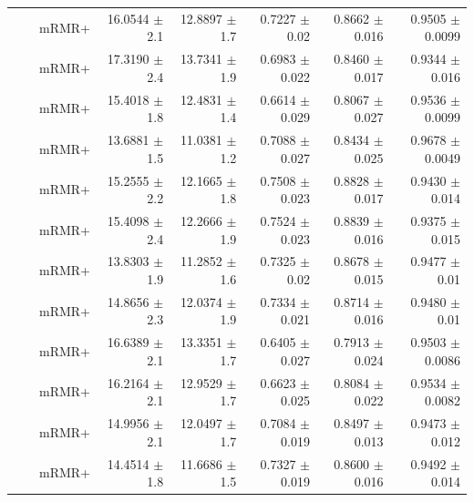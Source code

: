 \begin{longtable}{llp{}rrrrr}
 &  & mRMR+ & 16.0544 {\scriptsize $\pm$ 2.1} & 12.8897 {\scriptsize $\pm$ 1.7} & 0.7227 {\scriptsize $\pm$ 0.02} & 0.8662 {\scriptsize $\pm$ 0.016} & 0.9505 {\scriptsize $\pm$ 0.0099} \\
 &  & mRMR+ & 17.3190 {\scriptsize $\pm$ 2.4} & 13.7341 {\scriptsize $\pm$ 1.9} & 0.6983 {\scriptsize $\pm$ 0.022} & 0.8460 {\scriptsize $\pm$ 0.017} & 0.9344 {\scriptsize $\pm$ 0.016} \\
 &  & mRMR+ & 15.4018 {\scriptsize $\pm$ 1.8} & 12.4831 {\scriptsize $\pm$ 1.4} & 0.6614 {\scriptsize $\pm$ 0.029} & 0.8067 {\scriptsize $\pm$ 0.027} & 0.9536 {\scriptsize $\pm$ 0.0099} \\
 &  & mRMR+ & 13.6881 {\scriptsize $\pm$ 1.5} & 11.0381 {\scriptsize $\pm$ 1.2} & 0.7088 {\scriptsize $\pm$ 0.027} & 0.8434 {\scriptsize $\pm$ 0.025} & 0.9678 {\scriptsize $\pm$ 0.0049} \\
 &  & mRMR+ & 15.2555 {\scriptsize $\pm$ 2.2} & 12.1665 {\scriptsize $\pm$ 1.8} & 0.7508 {\scriptsize $\pm$ 0.023} & 0.8828 {\scriptsize $\pm$ 0.017} & 0.9430 {\scriptsize $\pm$ 0.014} \\
 &  & mRMR+ & 15.4098 {\scriptsize $\pm$ 2.4} & 12.2666 {\scriptsize $\pm$ 1.9} & 0.7524 {\scriptsize $\pm$ 0.023} & 0.8839 {\scriptsize $\pm$ 0.016} & 0.9375 {\scriptsize $\pm$ 0.015} \\
 &  & mRMR+ & 13.8303 {\scriptsize $\pm$ 1.9} & 11.2852 {\scriptsize $\pm$ 1.6} & 0.7325 {\scriptsize $\pm$ 0.02} & 0.8678 {\scriptsize $\pm$ 0.015} & 0.9477 {\scriptsize $\pm$ 0.01} \\
 &  & mRMR+ & 14.8656 {\scriptsize $\pm$ 2.3} & 12.0374 {\scriptsize $\pm$ 1.9} & 0.7334 {\scriptsize $\pm$ 0.021} & 0.8714 {\scriptsize $\pm$ 0.016} & 0.9480 {\scriptsize $\pm$ 0.01} \\
 &  & mRMR+ & 16.6389 {\scriptsize $\pm$ 2.1} & 13.3351 {\scriptsize $\pm$ 1.7} & 0.6405 {\scriptsize $\pm$ 0.027} & 0.7913 {\scriptsize $\pm$ 0.024} & 0.9503 {\scriptsize $\pm$ 0.0086} \\
 &  & mRMR+ & 16.2164 {\scriptsize $\pm$ 2.1} & 12.9529 {\scriptsize $\pm$ 1.7} & 0.6623 {\scriptsize $\pm$ 0.025} & 0.8084 {\scriptsize $\pm$ 0.022} & 0.9534 {\scriptsize $\pm$ 0.0082} \\
 &  & mRMR+ & 14.9956 {\scriptsize $\pm$ 2.1} & 12.0497 {\scriptsize $\pm$ 1.7} & 0.7084 {\scriptsize $\pm$ 0.019} & 0.8497 {\scriptsize $\pm$ 0.013} & 0.9473 {\scriptsize $\pm$ 0.012} \\
 &  & mRMR+ & 14.4514 {\scriptsize $\pm$ 1.8} & 11.6686 {\scriptsize $\pm$ 1.5} & 0.7327 {\scriptsize $\pm$ 0.019} & 0.8600 {\scriptsize $\pm$ 0.016} & 0.9492 {\scriptsize $\pm$ 0.014} \\

\end{longtable}
